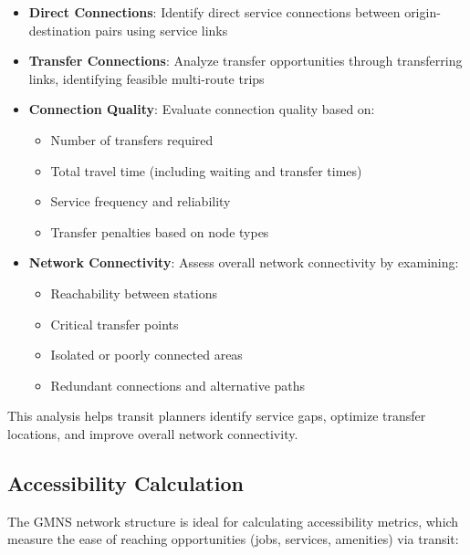\documentclass[11pt,a4paper]{article}
\begin{document}
\begin{itemize}
    \item \textbf{Direct Connections}: Identify direct service connections between origin-destination pairs using service links
    \item \textbf{Transfer Connections}: Analyze transfer opportunities through transferring links, identifying feasible multi-route trips
    \item \textbf{Connection Quality}: Evaluate connection quality based on:
    \begin{itemize}
        \item Number of transfers required
        \item Total travel time (including waiting and transfer times)
        \item Service frequency and reliability
        \item Transfer penalties based on node types
    \end{itemize}
    \item \textbf{Network Connectivity}: Assess overall network connectivity by examining:
    \begin{itemize}
        \item Reachability between stations
        \item Critical transfer points
        \item Isolated or poorly connected areas
        \item Redundant connections and alternative paths
    \end{itemize}
\end{itemize}

This analysis helps transit planners identify service gaps, optimize transfer locations, and improve overall network connectivity.

\subsection{Accessibility Calculation}

The GMNS network structure is ideal for calculating accessibility metrics, which measure the ease of reaching opportunities (jobs, services, amenities) via transit:
\end{document}
